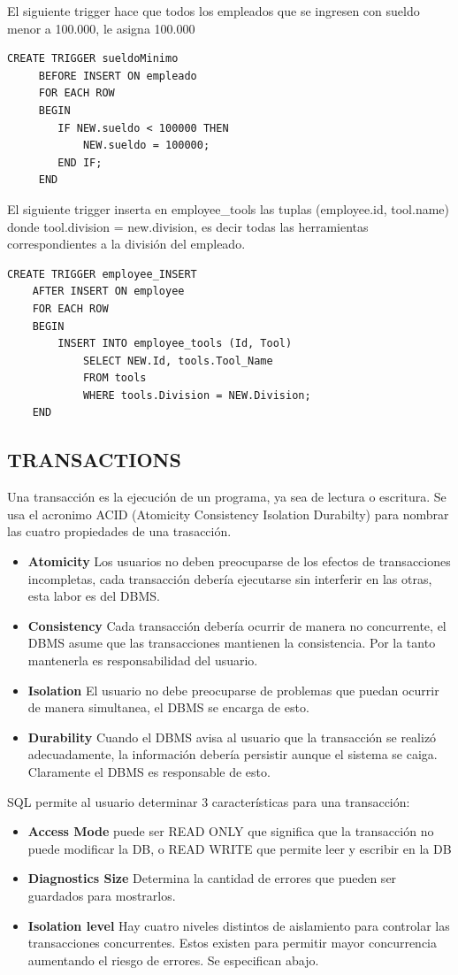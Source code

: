 \documentclass[11pt,letterpaper]{article}
\begin{document}
El siguiente trigger hace que todos los empleados que se ingresen con sueldo menor a 100.000, le asigna 100.000
\begin{lstlisting}[frame=single]
	 CREATE TRIGGER sueldoMinimo
     BEFORE INSERT ON empleado
     FOR EACH ROW
     BEGIN
     	IF NEW.sueldo < 100000 THEN
     		NEW.sueldo = 100000;
     	END IF;
     END
\end{lstlisting}
El siguiente trigger inserta en employee\_tools las tuplas (employee.id, tool.name) donde tool.division = new.division, es decir todas las herramientas correspondientes a la división del empleado.
\begin{lstlisting}[frame=single]
	CREATE TRIGGER employee_INSERT
	AFTER INSERT ON employee
	FOR EACH ROW
	BEGIN
    	INSERT INTO employee_tools (Id, Tool)
    		SELECT NEW.Id, tools.Tool_Name 
            FROM tools
            WHERE tools.Division = NEW.Division;
	END
\end{lstlisting}

\subsection{TRANSACTIONS}
Una transacción es la ejecución de un programa, ya sea de lectura o escritura.
Se usa el acronimo ACID (Atomicity Consistency Isolation Durabilty) para nombrar las cuatro propiedades de una trasacción.
\begin{itemize}
	\item \textbf{Atomicity} Los usuarios no deben preocuparse de los efectos de transacciones incompletas, cada transacción debería ejecutarse sin interferir en las otras, esta labor es del DBMS.
	\item \textbf{Consistency} Cada transacción debería ocurrir de manera no concurrente, el DBMS asume que las transacciones mantienen la consistencia. Por la tanto mantenerla es responsabilidad del usuario.
	\item \textbf{Isolation} El usuario no debe preocuparse de problemas que puedan ocurrir de manera simultanea, el DBMS se encarga de esto.
	\item \textbf{Durability} Cuando el DBMS avisa al usuario que la transacción se realizó adecuadamente, la información debería persistir aunque el sistema se caiga. Claramente el DBMS es responsable de esto.
\end{itemize}

SQL permite al usuario determinar 3 características para una transacción:
\begin{itemize}
	\item \textbf{Access Mode} puede ser READ ONLY que significa que la transacción no puede modificar la DB, o READ WRITE que permite leer y escribir en la DB
	\item \textbf{Diagnostics Size} Determina la cantidad de errores que pueden ser guardados para mostrarlos.
	\item \textbf{Isolation level} Hay cuatro niveles distintos de aislamiento para controlar las transacciones concurrentes. Estos existen para permitir mayor concurrencia aumentando el riesgo de errores. Se especifican abajo.
\end{itemize}
\end{document}
